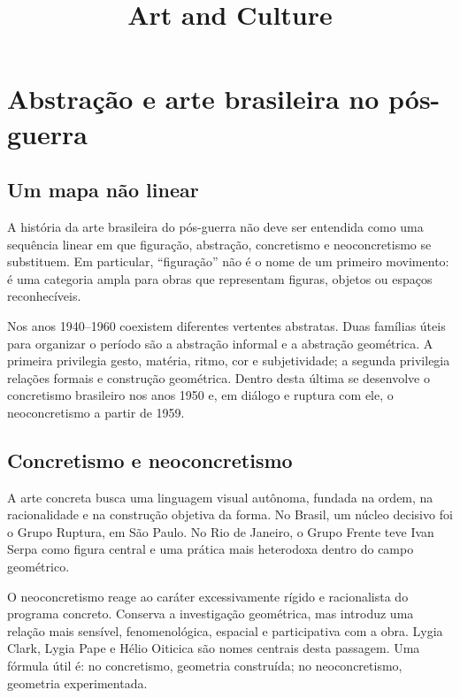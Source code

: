 



\title{Art and Culture}
\maketitle

\label{section-phantom}

\tableofcontents

\section{Abstração e arte brasileira no pós-guerra}

\subsection{Um mapa não linear}

A história da arte brasileira do pós-guerra não deve ser entendida como uma
sequência linear em que figuração, abstração, concretismo e neoconcretismo se
substituem. Em particular, ``figuração'' não é o nome de um primeiro movimento:
é uma categoria ampla para obras que representam figuras, objetos ou espaços
reconhecíveis.

Nos anos 1940--1960 coexistem diferentes vertentes abstratas. Duas famílias
úteis para organizar o período são a abstração informal e a abstração
geométrica. A primeira privilegia gesto, matéria, ritmo, cor e subjetividade; a
segunda privilegia relações formais e construção geométrica. Dentro desta
última se desenvolve o concretismo brasileiro nos anos 1950 e, em diálogo e
ruptura com ele, o neoconcretismo a partir de 1959.

\subsection{Concretismo e neoconcretismo}

A arte concreta busca uma linguagem visual autônoma, fundada na ordem, na
racionalidade e na construção objetiva da forma. No Brasil, um núcleo decisivo
foi o Grupo Ruptura, em São Paulo. No Rio de Janeiro, o Grupo Frente teve Ivan
Serpa como figura central e uma prática mais heterodoxa dentro do campo
geométrico.

O neoconcretismo reage ao caráter excessivamente rígido e racionalista do
programa concreto. Conserva a investigação geométrica, mas introduz uma relação
mais sensível, fenomenológica, espacial e participativa com a obra. Lygia
Clark, Lygia Pape e Hélio Oiticica são nomes centrais desta passagem. Uma
fórmula útil é: no concretismo, geometria construída; no neoconcretismo,
geometria experimentada.

